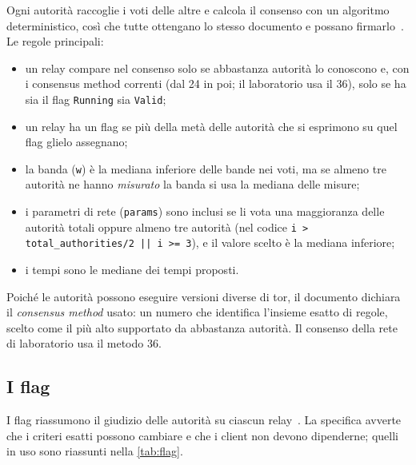 Ogni autorità raccoglie i voti delle altre e calcola il consenso con un algoritmo deterministico, così che tutte ottengano lo stesso documento e possano firmarlo~. Le regole principali:
\begin{itemize}
  \item un relay compare nel consenso solo se abbastanza autorità lo conoscono e, con i consensus method correnti (dal 24 in poi; il laboratorio usa il 36), solo se ha sia il flag \texttt{Running} sia \texttt{Valid};
  \item un relay ha un flag se più della metà delle autorità che si esprimono su quel flag glielo assegnano;
  \item la banda (\texttt{w}) è la mediana inferiore delle bande nei voti, ma se almeno tre autorità ne hanno \emph{misurato} la banda si usa la mediana delle misure;
  \item i parametri di rete (\texttt{params}) sono inclusi se li vota una maggioranza delle autorità totali oppure almeno tre autorità (nel codice \texttt{i > total\_authorities/2 || i >= 3}), e il valore scelto è la mediana inferiore;
  \item i tempi sono le mediane dei tempi proposti.
\end{itemize}
Poiché le autorità possono eseguire versioni diverse di tor, il documento dichiara il \emph{consensus method} usato: un numero che identifica l'insieme esatto di regole, scelto come il più alto supportato da abbastanza autorità. Il consenso della rete di laboratorio usa il metodo 36.

\subsection{I flag}\label{sec:dir-flag}

I flag riassumono il giudizio delle autorità su ciascun relay~. La specifica avverte che i criteri esatti possono cambiare e che i client non devono dipenderne; quelli in uso sono riassunti nella \cref{tab:flag}.

